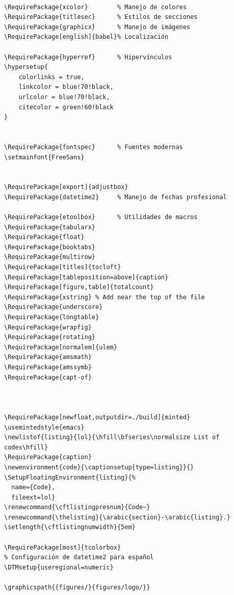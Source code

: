 \documentclass{reporti}
\begin{document}
\begin{verbatim}

\RequirePackage{xcolor}        % Manejo de colores
\RequirePackage{titlesec}      % Estilos de secciones
\RequirePackage{graphicx}      % Manejo de imágenes
\RequirePackage[english]{babel}% Localización

\RequirePackage{hyperref}      % Hipervínculos
\hypersetup{
    colorlinks = true,
    linkcolor = blue!70!black,
    urlcolor = blue!70!black,
    citecolor = green!60!black
}


\RequirePackage{fontspec}      % Fuentes modernas
\setmainfont{FreeSans}


\RequirePackage[export]{adjustbox}
\RequirePackage{datetime2}     % Manejo de fechas profesional

\RequirePackage{etoolbox}      % Utilidades de macros
\RequirePackage{tabularx}
\RequirePackage{float}
\RequirePackage{booktabs}
\RequirePackage{multirow}
\RequirePackage[titles]{tocloft}
\RequirePackage[tableposition=above]{caption}
\RequirePackage[figure,table]{totalcount}
\RequirePackage{xstring} % Add near the top of the file
\RequirePackage{underscore}
\RequirePackage{longtable}
\RequirePackage{wrapfig}
\RequirePackage{rotating}
\RequirePackage[normalem]{ulem}
\RequirePackage{amsmath}
\RequirePackage{amssymb}
\RequirePackage{capt-of}



\RequirePackage[newfloat,outputdir=./build]{minted}
\usemintedstyle{emacs}
\newlistof{listing}{lol}{\hfill\bfseries\normalsize List of codes\hfill}
\RequirePackage{caption}
\newenvironment{code}{\captionsetup{type=listing}}{}
\SetupFloatingEnvironment{listing}{%
  name={Code},
  fileext=lol}
\renewcommand{\cftlistingpresnum}{Code~}
\renewcommand{\thelisting}{\arabic{section}-\arabic{listing}.}
\setlength{\cftlistingnumwidth}{5em}

\RequirePackage[most]{tcolorbox}
% Configuración de datetime2 para español
\DTMsetup{useregional=numeric}

\graphicspath{{figures/}{figures/logo/}}
\end{verbatim}
\end{document}
